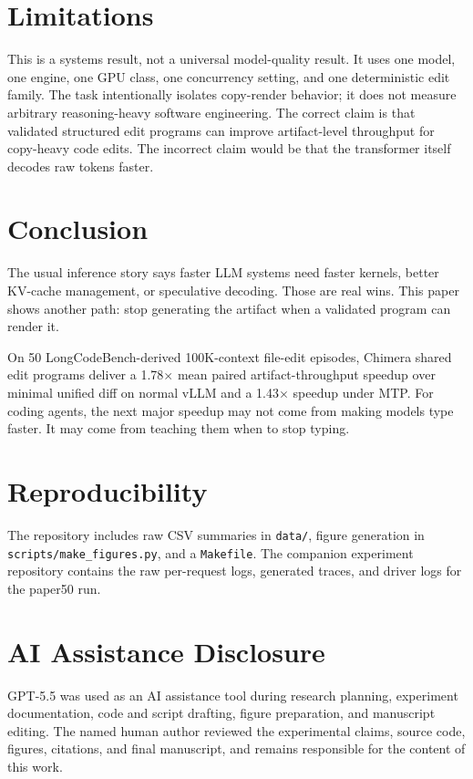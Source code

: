 \documentclass[10pt,twocolumn]{article}
\newcommand{\method}{Chimera}
\begin{document}
\section{Limitations}

This is a systems result, not a universal model-quality result. It uses one
model, one engine, one GPU class, one concurrency setting, and one deterministic
edit family. The task intentionally isolates copy-render behavior; it does not
measure arbitrary reasoning-heavy software engineering. The correct claim is
that validated structured edit programs can improve artifact-level throughput
for copy-heavy code edits. The incorrect claim would be that the transformer
itself decodes raw tokens faster.

\section{Conclusion}

The usual inference story says faster LLM systems need faster kernels, better
KV-cache management, or speculative decoding. Those are real wins. This paper
shows another path: stop generating the artifact when a validated program can
render it.

On 50 LongCodeBench-derived 100K-context file-edit episodes, \method{} shared
edit programs deliver a 1.78$\times$ mean paired artifact-throughput speedup
over minimal unified diff on normal vLLM and a 1.43$\times$ speedup under MTP.
For coding agents, the next major speedup may not come from making models type
faster. It may come from teaching them when to stop typing.

\section*{Reproducibility}

The repository includes raw CSV summaries in \texttt{data/}, figure generation
in \texttt{scripts/make\_figures.py}, and a \texttt{Makefile}. The companion
experiment repository contains the raw per-request logs, generated traces, and
driver logs for the paper50 run.

\section*{AI Assistance Disclosure}

GPT-5.5 was used as an AI assistance tool during research planning, experiment
documentation, code and script drafting, figure preparation, and manuscript
editing. The named human author reviewed the experimental claims, source code,
figures, citations, and final manuscript, and remains responsible for the
content of this work.



\end{document}
